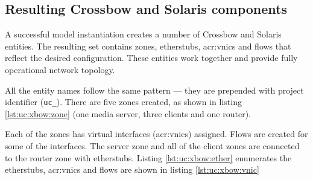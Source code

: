\documentclass[11pt]{book}
\begin{document}
      
      
      \subsection{Resulting Crossbow and Solaris components}
      \label{sub:uc:xbow}

        A successful model instantiation creates a number of Crossbow and Solaris entities. The resulting set contains
        zones, etherstubs, \gls{acr:vnic}s and flows that reflect the desired configuration. These entities work together and
        provide fully operational network topology.

        All the entity names follow the same pattern --- they are prepended with project identifier (\texttt{uc\_}).
        There are five zones created, as shown in listing \ref{lst:uc:xbow:zone} (one media server, three clients and
        one router). \\

        \noindent
        \begin{minipage}{\textwidth}
          
        \end{minipage}

        Each of the zones has virtual interfaces (\gls{acr:vnic}s) assigned. Flows are created for some of the interfaces. The
        server zone and all of the client zones are connected to the router zone with etherstubs. Listing
        \ref{lst:uc:xbow:ether} enumerates the etherstubs, \gls{acr:vnic}s and flows are shown in listing \ref{lst:uc:xbow:vnic} \\

        \noindent
        \begin{minipage}{\textwidth}
          
        \end{minipage}

        \noindent
        \begin{minipage}{\textwidth}
          
        \end{minipage}
\end{document}
